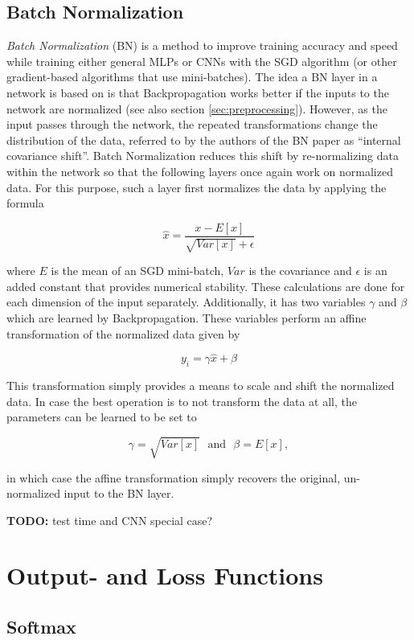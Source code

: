		\subsection {Batch Normalization}
\label{subsec:batchnorm}
\textit{Batch Normalization} (BN) \cite{batchnorm} is a method to improve training accuracy and speed while training either general MLPs or CNNs with the SGD algorithm (or other gradient-based algorithms that use mini-batches). The idea a BN layer in a network is based on is that Backpropagation works better if the inputs to the network are normalized (see also section \ref{sec:preprocessing}). However, as the input passes through the network, the repeated transformations change the distribution of the data, referred to by the authors of the BN paper as ``internal covariance shift''. Batch Normalization reduces this shift by re-normalizing data within the network so that the following layers once again work on normalized data. For this purpose, such a layer first normalizes the data by applying the formula 

\[  \hat{x} = \frac{x - E[x]}{\sqrt{Var[x]} + \epsilon} \]

\noindent where $E$ is the mean of an SGD mini-batch, $Var$ is the covariance and $\epsilon$ is an added constant that provides numerical stability. These calculations are done for each dimension of the input separately. Additionally, it has two variables $\gamma$ and $\beta$ which are learned by Backpropagation. These variables perform an affine transformation of the normalized data given by

\[ y_i = \gamma \hat{x} + \beta \]

\noindent This transformation simply provides a means to scale and shift the normalized data. In case the best operation is to not transform the data at all, the parameters can be learned to be set to 

\[ \gamma = \sqrt{Var[x]} \,\,\text{ and } \,\, \beta = E[x] ,\]

\noindent in which case the affine transformation simply recovers the original, un-normalized input to the BN layer.

\textbf{TODO:} test time and CNN special case?



	\section {Output- and Loss Functions}

	\subsection{Softmax}
\label{subsec:softmax}

